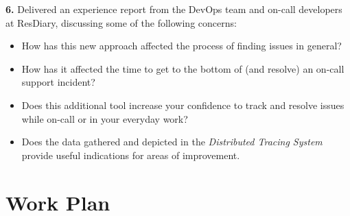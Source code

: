 \documentclass[11pt]{article}
\begin{document}
\textbf{6.} Delivered an experience report from the DevOps team and on-call developers at ResDiary, discussing some of the following concerns:
\begin{itemize}
    \item How has this new approach affected the process of finding issues in general?
    \item How has it affected the time to get to the bottom of (and resolve) an on-call support incident?
    \item Does this additional tool increase your confidence to track and resolve issues while on-call or in your everyday work?
    \item Does the data gathered and depicted in the \textit{Distributed Tracing System} provide useful indications for areas of improvement.
\end{itemize}

\section{Work Plan}
\label{WorkPlan}


\end{document}
